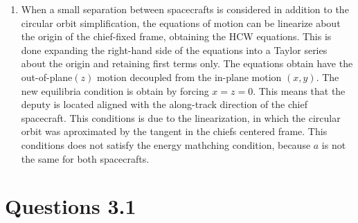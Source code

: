 \documentclass[a4paper]{article}
\begin{document}
\begin{enumerate}[label=\emph{\alph*)}]
  \item %
    When a small separation between spacecrafts is considered in addition to the circular orbit simplification, the equations of motion can be linearize about the origin of the chief-fixed frame, obtaining the HCW equations. This is done expanding the right-hand side of the equations into a Taylor series about the origin and retaining first terms only. The equations obtain have the out-of-plane$(z)$ motion decoupled from the in-plane motion $(x,y)$. The new equilibria condition is obtain by forcing $x=z=0$. This means that the deputy is located aligned with the along-track direction of the chief spacecraft. This conditions is due to the linearization, in which the circular orbit was aproximated by the tangent in the chiefs centered frame. This conditions does not satisfy the energy mathching condition, because $a$ is not the same for both spacecrafts.

\end{enumerate}
\section{Questions 3.1}
\end{document}
